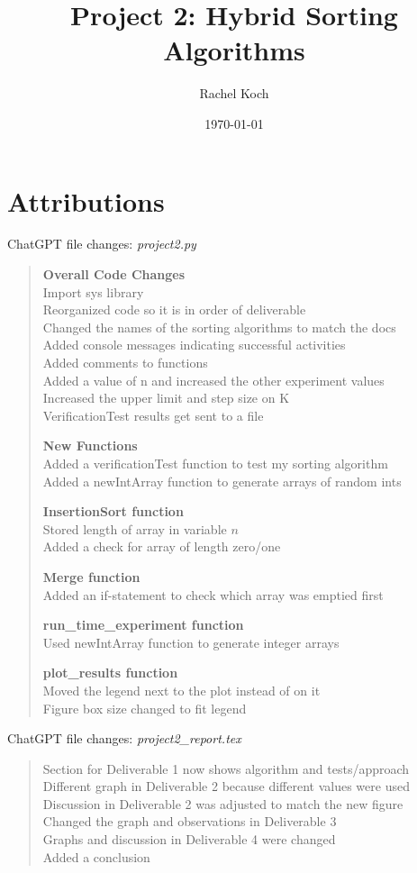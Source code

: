 \documentclass{article}
\title{Project 2: Hybrid Sorting Algorithms}
\author{Rachel Koch}
\date{\today}
\begin{document}
	
\maketitle

\section{Attributions}

ChatGPT file changes: \textit{project2.py}
\begin{quote}
\textbf{Overall Code Changes} \\
Import sys library \\
Reorganized code so it is in order of deliverable \\
Changed the names of the sorting algorithms to match the docs \\
Added console messages indicating successful activities \\
Added comments to functions \\
Added a value of n and increased the other experiment values \\
Increased the upper limit and step size on K \\
VerificationTest results get sent to a file

\textbf{New Functions} \\
Added a verificationTest function to test my sorting algorithm \\
Added a newIntArray function to generate arrays of random ints

\textbf{InsertionSort function} \\
Stored length of array in variable $n$ \\
Added a check for array of length zero/one 

\textbf{Merge function} \\
Added an if-statement to check which array was emptied first

\textbf{run\_time\_experiment function} \\
Used newIntArray function to generate integer arrays

\textbf{plot\_results function} \\
Moved the legend next to the plot instead of on it \\
Figure box size changed to fit legend
\end{quote}

ChatGPT file changes: \textit{project2\_report.tex}

\begin{quote}
Section for Deliverable 1 now shows algorithm and tests/approach \\
Different graph in Deliverable 2 because different values were used \\
Discussion in Deliverable 2 was adjusted to match the new figure \\
Changed the graph and observations in Deliverable 3 \\
Graphs and discussion in Deliverable 4 were changed \\
Added a conclusion
\end{quote}
	
\end{document}
